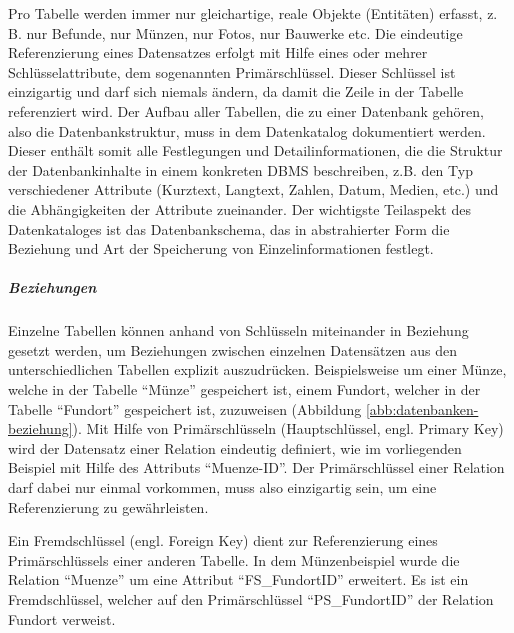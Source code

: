 Pro Tabelle werden immer nur gleichartige, reale Objekte (Entitäten) erfasst, z. B. nur Befunde, nur Münzen, nur Fotos, nur Bauwerke etc. Die eindeutige Referenzierung eines Datensatzes erfolgt mit Hilfe eines oder mehrer Schlüsselattribute, dem sogenannten Primärschlüssel. Dieser Schlüssel ist einzigartig und darf sich niemals ändern, da damit die Zeile in der Tabelle referenziert wird. Der Aufbau aller Tabellen, die zu einer Datenbank gehören, also die Datenbankstruktur, muss in dem Datenkatalog dokumentiert werden. Dieser enthält somit alle Festlegungen und Detailinformationen, die die Struktur der Datenbankinhalte in einem konkreten DBMS beschreiben, z.B. den Typ verschiedener Attribute (Kurztext, Langtext, Zahlen, Datum, Medien, etc.) und die Abhängigkeiten der Attribute zueinander. Der wichtigste Teilaspekt des Datenkataloges ist das Datenbankschema, das in abstrahierter Form die Beziehung und Art der Speicherung von Einzelinformationen festlegt.


\subparagraph{Beziehungen}
Einzelne Tabellen können anhand von Schlüsseln miteinander in Beziehung gesetzt werden, um Beziehungen zwischen einzelnen Datensätzen aus den unterschiedlichen Tabellen explizit auszudrücken. Beispielsweise um einer Münze, welche in der Tabelle "`Münze"' gespeichert ist, einem Fundort, welcher in der Tabelle "`Fundort"' gespeichert ist, zuzuweisen (Abbildung \ref{abb:datenbanken-beziehung}). Mit Hilfe von Primärschlüsseln (Hauptschlüssel, engl. Primary Key) wird der Datensatz einer Relation eindeutig definiert, wie im vorliegenden Beispiel mit Hilfe des Attributs "`Muenze-ID"'. Der Primärschlüssel einer Relation darf dabei nur einmal vorkommen, muss also einzigartig sein, um eine Referenzierung zu gewährleisten.
 
Ein Fremdschlüssel (engl. Foreign Key) dient zur Referenzierung eines Primärschlüssels einer anderen Tabelle. In dem Münzenbeispiel wurde die Relation "`Muenze"' um eine Attribut "`FS\_FundortID"' erweitert. Es ist ein Fremdschlüssel, welcher auf den Primärschlüssel "`PS\_FundortID"' der Relation Fundort verweist.


